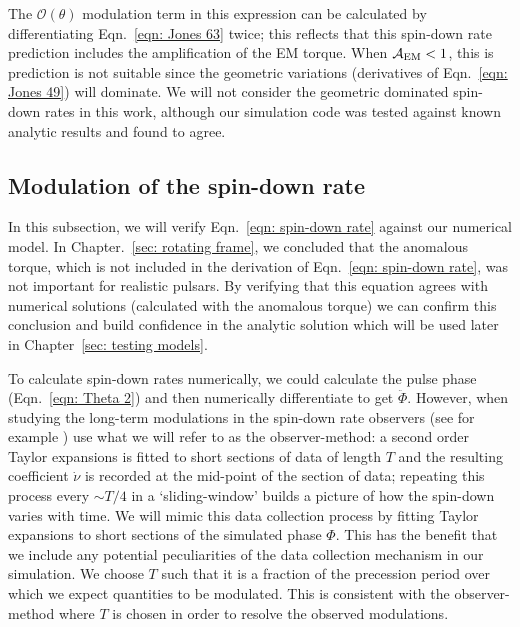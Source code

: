 \documentclass[../full_thesis/full_thesis.tex]{subfiles}
\begin{document}
The $\mathcal{O}(\theta)$ modulation term in this expression can be calculated
by differentiating Eqn.~\eqref{eqn: Jones 63} twice; this reflects that this
spin-down rate prediction includes the amplification of the EM torque. When
$\mathcal{A}_{\mathrm{EM}} < 1$, this is prediction is not suitable since the geometric variations
(derivatives of Eqn.~\eqref{eqn: Jones 49}) will dominate. We will not consider
the geometric dominated spin-down rates in this work, although our simulation
code was tested against known analytic results and found to agree.

\subsection{Modulation of the spin-down rate}
\label{sec: spin-down rate numerical}

In this subsection, we will verify Eqn.~\eqref{eqn: spin-down rate} against our
numerical model. In Chapter.~\ref{sec: rotating frame}, we concluded that the
anomalous torque, which is not included in the derivation of Eqn.~\eqref{eqn:
spin-down rate}, was not important for realistic pulsars. By verifying that
this equation agrees with numerical solutions (calculated with the anomalous
torque) we can confirm this conclusion and build confidence in the analytic
solution which will be used later in Chapter~\ref{sec: testing models}.

 To calculate spin-down rates numerically, we could calculate the pulse phase
(Eqn.~\eqref{eqn: Theta 2}) and then numerically differentiate to get
$\ddot{\Phi}$. However, when studying the long-term modulations in the spin-down
rate observers (see for example \citet{Lyne2010, Perera2015}) use what we will
refer to as the observer-method: a second order Taylor expansions is
fitted to short sections of data of length $T$ and the resulting coefficient
$\dot{\nu}$ is recorded at the mid-point of the section of data; repeating
this process every $\sim T/4$ in a `sliding-window' builds a picture of how the
spin-down varies with time.  We will mimic this data collection process by
fitting Taylor expansions to short sections of the simulated phase $\Phi$. This
has the benefit that we include any potential peculiarities of the data
collection mechanism in our simulation.  We choose $T$ such that it is a
fraction of the precession period over which we expect quantities to be
modulated. This is consistent with the observer-method where $T$ is chosen in
order to resolve the observed modulations.
\end{document}

